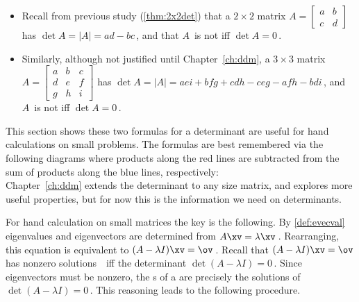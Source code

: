 \begin{itemize}
\item Recall from previous study (\autoref{thm:2x2det}) that a \(2\times 2\) matrix \(A=\begin{bmatrix} a&b\\c&d \end{bmatrix}\) has  \(\det A=|A|=ad-bc\)\,, and that \(A\)~is not  iff \(\det A=0\)\,.
\item Similarly, although not justified until Chapter~\ref{ch:ddm}, a \(3\times 3\) matrix \(A=\begin{bmatrix} a&b&c\\d&e&f\\g&h&i \end{bmatrix}\) has  \(\det A=|A|=aei+bfg+cdh-ceg-afh-bdi\)\,, and \(A\)~is not  iff \(\det A=0\)\,.
\end{itemize}
This section shows these two formulas for a determinant are useful for hand calculations on small problems.
The formulas are best remembered via the following diagrams where products along the red lines are subtracted from the sum of products along the blue lines, respectively:
\begin{equation}

\label{eq:dets23}
\end{equation}
Chapter~\ref{ch:ddm} extends the determinant to any size matrix, and explores more useful properties, but for now this is the information we need on determinants.


For hand calculation on small matrices the key is the following.
By \autoref{def:evecval} eigenvalues and eigenvectors are determined from \(A\xv=\lambda\xv\)\,.  
Rearranging, this equation is equivalent to \((A-\lambda I)\xv=\ov\)\,.  
Recall that \((A-\lambda I)\xv=\ov\) has nonzero solutions~\xv\ iff the determinant \(\det(A-\lambda I)=0\)\,.
Since eigenvectors must be nonzero, the s of a  are precisely the solutions of \(\det(A-\lambda I)=0\)\,. 
This reasoning leads to the following procedure.


